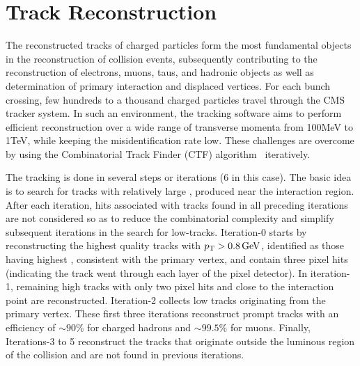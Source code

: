 \section{Track Reconstruction}\label{sec:trackReco}
The reconstructed tracks of charged particles form the most fundamental objects in the reconstruction of collision events, subsequently 
contributing to the reconstruction of electrons, muons, taus, and hadronic objects as well as determination of primary interaction and 
displaced vertices. For each bunch crossing, few hundreds to a thousand charged particles travel through the CMS tracker system. In such
an environment, the tracking software aims to perform efficient reconstruction over a wide range of transverse momenta from 100\unit{MeV} to 
1\unit{TeV}, while keeping the misidentification rate low. These challenges are overcome by using the Combinatorial Track Finder (\gls{CTF}) 
algorithm~\cite{Adam:934067,Chatrchyan:2014fea} iteratively.

The tracking is done in several steps or iterations (6 in this case). The basic idea is to search for tracks with relatively large \pt,
produced near the interaction region. After each iteration, hits associated with tracks found in all preceding iterations are not considered
so as to reduce the combinatorial complexity and simplify subsequent iterations in the search for low-\pt tracks. Iteration-0 starts by reconstructing 
the highest quality tracks with $p_{\mathrm T}>0.8\mathrm{\,GeV}$, identified as those having highest \pt, consistent with the primary vertex, and contain three 
pixel hits (indicating the track went through each layer of the pixel detector). In iteration-1, remaining high \pt tracks with only two pixel hits 
and close to the interaction point are reconstructed. Iteration-2 collects low \pt tracks originating from the primary vertex. These first three 
iterations reconstruct prompt tracks with an efficiency of $\sim90\%$ for charged hadrons and $\sim99.5\%$ for muons. Finally, Iterations-3 to 5 
reconstruct the tracks that originate outside the luminous region of the collision and are not found in previous iterations.

